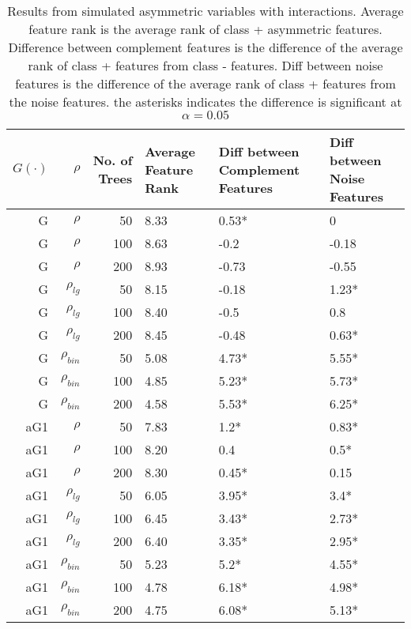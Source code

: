 \documentclass[twoside,11pt]{article}
\begin{document}
\begin{table}%
  \centering
  \caption{Results from simulated asymmetric variables with interactions. Average feature rank is the average rank of class + asymmetric features. Difference between complement features is the difference of the average rank of class + features from class - features. Diff between noise features is the difference of the average rank of class + features from the noise features. the asterisks indicates the difference is significant at $\alpha=0.05$ }
\begin{tabular}{rrrp{2.5cm}p{2.5cm}p{2.5cm}}
\hline
$G(\cdot)$ & $\rho$ & No. of Trees & Average Feature Rank & Diff between Complement Features & Diff between Noise Features \bigstrut\\
\hline
\renewcommand{\arraystretch}{.5}
G     & $\rho$ & 50    & 8.33  & 0.53* & 0 \bigstrut[t]\\
G     & $\rho$ & 100   & 8.63  & -0.2  & -0.18 \\
G     & $\rho$ & 200   & 8.93  & -0.73 & -0.55 \bigstrut[b]\\
\hline
G     & $\rho_{lg}$ & 50    & 8.15  & -0.18 & 1.23* \bigstrut[t]\\
G     & $\rho_{lg}$ & 100   & 8.40  & -0.5  & 0.8 \\
G     & $\rho_{lg}$ & 200   & 8.45  & -0.48 & 0.63* \bigstrut[b]\\
\hline
G     & $\rho_{bin}$ & 50    & 5.08  & 4.73* & 5.55* \bigstrut[t]\\
G     & $\rho_{bin}$ & 100   & 4.85  & 5.23* & 5.73* \\
G     & $\rho_{bin}$ & 200   & 4.58  & 5.53* & 6.25* \bigstrut[b]\\
\hline
aG1   & $\rho$ & 50    & 7.83  & 1.2*  & 0.83* \bigstrut[t]\\
aG1   & $\rho$ & 100   & 8.20  & 0.4   & 0.5* \\
aG1   & $\rho$ & 200   & 8.30  & 0.45* & 0.15 \bigstrut[b]\\
\hline
aG1   & $\rho_{lg}$ & 50    & 6.05  & 3.95* & 3.4* \bigstrut[t]\\
aG1   & $\rho_{lg}$ & 100   & 6.45  & 3.43* & 2.73* \\
aG1   & $\rho_{lg}$ & 200   & 6.40  & 3.35* & 2.95* \bigstrut[b]\\
\hline
aG1   & $\rho_{bin}$ & 50    & 5.23  & 5.2*  & 4.55* \bigstrut[t]\\
aG1   & $\rho_{bin}$ & 100   & 4.78  & 6.18* & 4.98* \\
aG1   & $\rho_{bin}$ & 200   & 4.75  & 6.08* & 5.13* \bigstrut[b]\\

\end{tabular}
\end{table}
\end{document}
